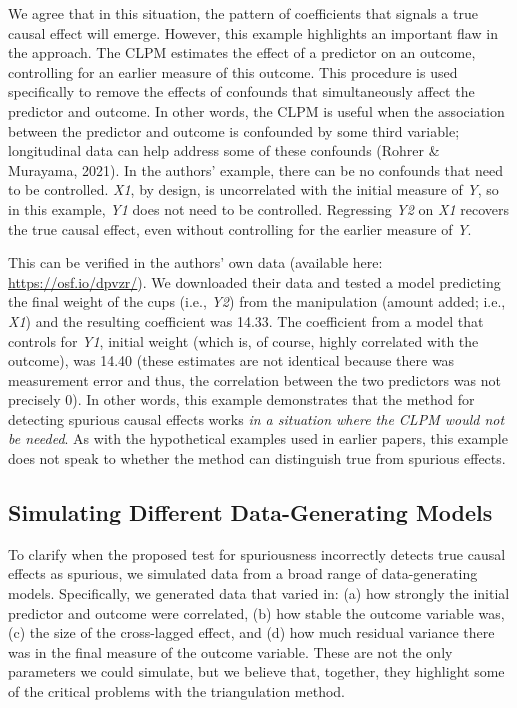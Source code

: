 \documentclass[
  man,floatsintext]{apa6}
\begin{document}
We agree that in this situation, the pattern of coefficients that signals a true causal effect will emerge. However, this example highlights an important flaw in the approach. The CLPM estimates the effect of a predictor on an outcome, controlling for an earlier measure of this outcome. This procedure is used specifically to remove the effects of confounds that simultaneously affect the predictor and outcome. In other words, the CLPM is useful when the association between the predictor and outcome is confounded by some third variable; longitudinal data can help address some of these confounds (Rohrer \& Murayama, 2021). In the authors' example, there can be no confounds that need to be controlled. \emph{X1}, by design, is uncorrelated with the initial measure of \emph{Y}, so in this example, \emph{Y1} does not need to be controlled. Regressing \emph{Y2} on \emph{X1} recovers the true causal effect, even without controlling for the earlier measure of \emph{Y}.

This can be verified in the authors' own data (available here: \url{https://osf.io/dpvzr/}). We downloaded their data and tested a model predicting the final weight of the cups (i.e., \emph{Y2}) from the manipulation (amount added; i.e., \emph{X1}) and the resulting coefficient was 14.33. The coefficient from a model that controls for \emph{Y1}, initial weight (which is, of course, highly correlated with the outcome), was 14.40 (these estimates are not identical because there was measurement error and thus, the correlation between the two predictors was not precisely 0). In other words, this example demonstrates that the method for detecting spurious causal effects works \emph{in a situation where the CLPM would not be needed}. As with the hypothetical examples used in earlier papers, this example does not speak to whether the method can distinguish true from spurious effects.

\subsection{Simulating Different Data-Generating Models}\label{simulating-different-data-generating-models}

To clarify when the proposed test for spuriousness incorrectly detects true causal effects as spurious, we simulated data from a broad range of data-generating models. Specifically, we generated data that varied in: (a) how strongly the initial predictor and outcome were correlated, (b) how stable the outcome variable was, (c) the size of the cross-lagged effect, and (d) how much residual variance there was in the final measure of the outcome variable. These are not the only parameters we could simulate, but we believe that, together, they highlight some of the critical problems with the triangulation method.
\end{document}
